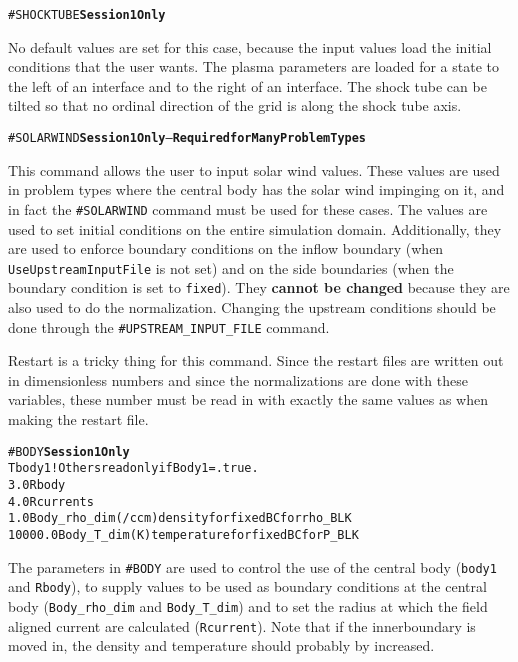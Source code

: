 \begin{alltt}
#SHOCKTUBE   \hfill {\bf Session 1 Only}
\end{alltt}
No default values are set for this case, because the input values load
the initial conditions that the user wants.  The plasma parameters are
loaded for a state to the left of an interface and to the right of an
interface.  The shock tube can be tilted so that no ordinal direction
of the grid is along the shock tube axis.
\ \ \\


\begin{alltt}
#SOLARWIND  \hfill {\bf Session 1 Only} -- {\bf Required for Many Problem Types}
\end{alltt}

This command allows the user to input solar wind values.  These values
are used in problem types where the central body has the solar wind impinging
on it, and in fact the {\tt \#SOLARWIND} command must be used for these
cases. The values are used to set initial conditions on the entire
simulation domain.  Additionally, they are used to enforce boundary
conditions on the inflow boundary (when {\tt UseUpstreamInputFile} 
is not set) and on the side boundaries (when the boundary condition is
set to {\tt fixed}).  They {\bf cannot be changed} because they are also
used to do the normalization.  Changing the upstream conditions should
be done through the {\tt \#UPSTREAM\_INPUT\_FILE} command.

Restart is a tricky thing for this command.  Since the restart files are
written out in dimensionless numbers and since the normalizations are
done with these variables, these number must be read in with exactly
the same values as when making the restart file.
\ \ \\


\begin{alltt}
#BODY    \hfill {\bf Session 1 Only}
T                      body1   !Others read only if Body1=.true.
3.0                    Rbody
4.0                    Rcurrents
1.0                    Body_rho_dim (/ccm) density for fixed BC for rho_BLK
10000.0                Body_T_dim (K) temperature for fixed BC for P_BLK
\end{alltt}

The parameters in {\tt \#BODY} are used to control the use
of the central body ({\tt body1} and {\tt Rbody}), to supply values to be used as 
boundary conditions at the central body  ({\tt Body\_rho\_dim} and 
{\tt Body\_T\_dim})
and to set the radius at which the field aligned current
are calculated ({\tt Rcurrent}).  Note that if the innerboundary is moved in, 
the density and temperature should probably by increased.
\ \ \\

